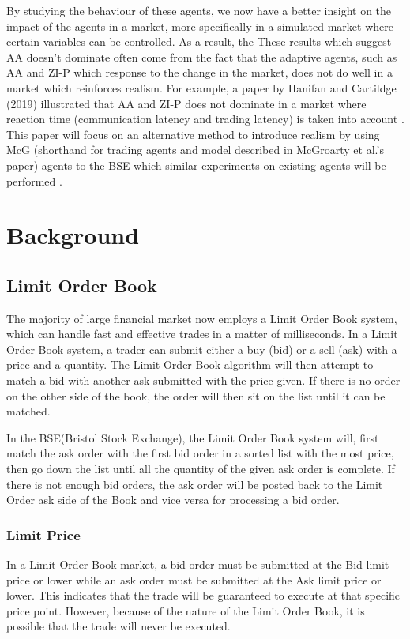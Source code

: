 \documentclass{article}
\begin{document}
By studying the behaviour of these agents, we now have a better insight on the impact of the agents in a market, more specifically in a simulated market where certain variables can be controlled. As a result, the These results which suggest AA doesn’t dominate often come from the fact that the adaptive agents, such as AA and ZI-P which response to the change in the market, does not do well in a market which reinforces realism. For example, a paper by Hanifan and Cartildge (2019) illustrated that  AA and ZI-P does not dominate in a market where reaction time (communication latency and trading latency) is taken into account \cite{foolsrush}. This paper will focus on an alternative method to introduce realism by using McG (shorthand for trading agents and model described in McGroarty et al.'s paper) agents to the BSE which similar experiments on existing agents will be performed \cite{McGroarty}. 

\section{Background}
\subsection{Limit Order Book}
The majority of large financial market now employs a Limit Order Book system, which can handle fast and effective trades in a matter of milliseconds. In a Limit Order Book system, a trader can submit either a buy (bid) or a sell (ask) with a price and a quantity. The Limit Order Book algorithm will then attempt to match a bid with another ask submitted with the price given. If there is no order on the other side of the book, the order will then sit on the list until it can be matched. 

In the BSE(Bristol Stock Exchange), the Limit Order Book system will, first match the ask order with the first bid order in a sorted list with the most price, then go down the list until all the quantity of the given ask order is complete. If there is not enough bid orders, the ask order will be posted back to the Limit Order ask side of the Book and vice versa for processing a bid order.

\subsubsection{Limit Price}
In a Limit Order Book market, a bid order must be submitted at the Bid limit price or lower while an ask order must be submitted at the Ask limit price or lower. This indicates that the trade will be guaranteed to execute at that specific price point. However, because of the nature of the Limit Order Book, it is possible that the trade will never be executed. 
\end{document}
